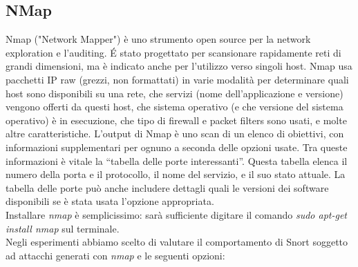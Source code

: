 	\subsection{NMap}
	Nmap ("Network Mapper") è uno strumento open source per la network exploration e l'auditing. \'E stato progettato per scansionare rapidamente reti di grandi dimensioni, ma è indicato anche per l'utilizzo verso singoli host. Nmap usa pacchetti IP raw (grezzi, non formattati) in varie modalità per determinare quali host sono disponibili su una rete, che servizi (nome dell'applicazione e versione) vengono offerti da questi host, che sistema operativo (e che versione del sistema operativo) è in esecuzione, che tipo di firewall e packet filters sono usati, e molte altre caratteristiche.
	L'output di Nmap è uno scan di un elenco di obiettivi, con informazioni supplementari per ognuno a seconda delle opzioni usate. Tra queste informazioni è vitale la ``tabella delle porte interessanti''. Questa tabella elenca il numero della porta e il protocollo, il nome del servizio, e il suo stato attuale.  La tabella delle porte può anche includere dettagli quali le versioni dei software disponibili se è stata usata l'opzione appropriata.\\
	Installare \textit{nmap} è semplicissimo: sarà sufficiente digitare il comando \textit{sudo apt-get install nmap} sul terminale.\\
	Negli esperimenti abbiamo scelto di valutare il comportamento di Snort soggetto ad attacchi generati con \textit{nmap} e le seguenti opzioni:
